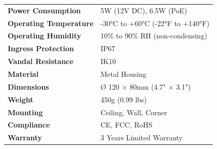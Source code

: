 \documentclass[11pt,a4paper]{article}
\begin{document}
{\begin{longtable}{@{}p{4cm}X@{}}
\textbf{Power Consumption} & 5W (12V DC), 6.5W (PoE) \\
\textbf{Operating Temperature} & -30°C to +60°C (-22°F to +140°F) \\
\textbf{Operating Humidity} & 10\% to 90\% RH (non-condensing) \\
\textbf{Ingress Protection} & IP67 \\
\textbf{Vandal Resistance} & IK10 \\
\textbf{Material} & Metal Housing \\
\textbf{Dimensions} & Ø 120 × 80mm (4.7" × 3.1") \\
\textbf{Weight} & 450g (0.99 lbs) \\
\textbf{Mounting} & Ceiling, Wall, Corner \\
\textbf{Compliance} & CE, FCC, RoHS \\
\textbf{Warranty} & 3 Years Limited Warranty \\

\end{longtable}
}
\end{document}
